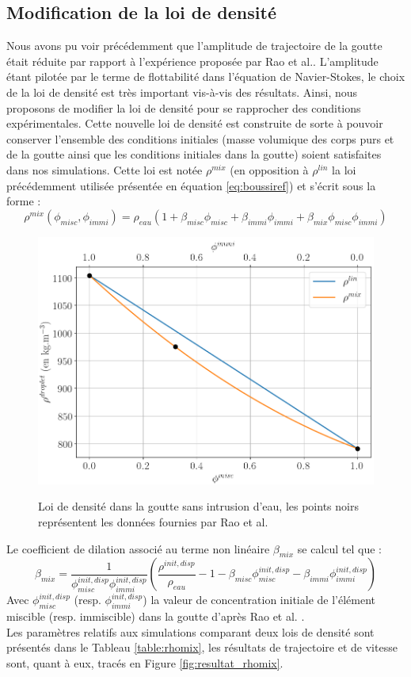 \subsection{Modification de la loi de densité}
Nous avons pu voir précédemment que l'amplitude de trajectoire de la goutte était réduite par rapport à l'expérience proposée par Rao et al.. L'amplitude étant pilotée par le terme de flottabilité dans l'équation de Navier-Stokes, le choix de la loi de densité est très important vis-à-vis des résultats. Ainsi, nous proposons de modifier la loi de densité pour se rapprocher des conditions expérimentales. Cette nouvelle loi de densité est construite de sorte à pouvoir conserver l'ensemble des conditions initiales (masse volumique des corps purs et de la goutte ainsi que les conditions initiales dans la goutte) soient satisfaites dans nos simulations. Cette loi est notée $\rho^{mix}$ (en opposition à $\rho^{lin}$ la loi précédemment utilisée présentée en équation \ref{eq:boussiref}) et s'écrit sous la forme :
\begin{equation*}
\rho^{mix}({\phi_{misc},\phi_{immi}}) = \rho_{eau} \left(   1 + \beta_{misc}\phi_{misc} +\beta_{immi} \phi_{immi} + \beta_{mix}\phi_{misc}\phi_{immi} \right)
\end{equation*} \vspace{-1cm}
\begin{figure}[H]
	\centering
	\includegraphics[width=0.65\linewidth]{figure/rho_droplet}
	\label{fig:rhodroplet}
	\caption{Loi de densité dans la goutte sans intrusion d'eau, les points noirs représentent les données fournies par Rao et al. \cite{rao_influence_2015}}
\end{figure}
Le coefficient de dilation associé au terme non linéaire $\beta_{mix}$ se calcul tel que :
\begin{equation}
	\beta_{mix} = \frac{1}{\phi_{misc}^{init,disp}\phi_{immi}^{init,disp}} \left(\frac{\rho^{init,disp}}{\rho_{eau}}- 1 - \beta_{misc} \phi_{misc}^{init,disp} - \beta_{immi} \phi_{immi}^{init,disp}\right)
\end{equation}
Avec $\phi_{misc}^{init,disp}$ (resp. $\phi_{immi}^{init,disp}$) la valeur de concentration initiale de l'élément miscible (resp. immiscible) dans la goutte d'après Rao et al. \cite{rao_influence_2015}.\\
Les paramètres relatifs aux simulations comparant deux lois de densité sont présentés dans le Tableau \ref{table:rhomix}, les résultats de trajectoire et de vitesse sont, quant à eux, tracés en Figure \ref{fig:resultat_rhomix}.

